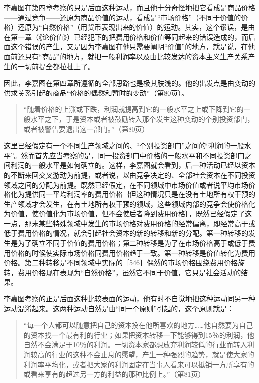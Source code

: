 李嘉图在第四章考察的只是后面这种运动，而且他十分奇怪地把它看成是商品价格——通过竞争——还原为商品价值的运动，看成是“市场价格”（不同于价值的价格）还原为“自然价格”（用货币表现出来的价值）的运动。其实，这个谬误，是由在第一章（《论价值》）已经犯下的把费用价格和价值等同起来的错误造成的，而后面这个错误的产生，又是因为李嘉图在他只需要阐明“价值”的地方，就是说，在他面前还只有“商品”的地方，就把一般利润率以及由比较发达的资本主义生产关系产生的一切前提全都拉扯上了。

因此，李嘉图在第四章所遵循的全部思路也是极其肤浅的。他的出发点是由变动的供求关系引起的商品“价格的偶然和暂时的变动”（第80页）。

\begin{quote}{“随着价格的上涨或下跌，利润就提高到它的一般水平之上或下降到它的一般水平之下，于是资本或者被鼓励转入那个发生这种变动的个别投资部门，或者被警告要退出这一部门。”（第80页）}\end{quote}

这里已经假定有一个不同生产领域之间的、“个别投资部门”之间的“利润的一般水平”。然而首先应当考察的是，同一投资部门中价格的一般水平和不同投资部门之间利润的一般水平是如何确立的。这样，李嘉图就会看到，后一种活动已经以资本的不断来回交叉游动为前提，或者说，以由竞争决定的、全部社会资本在不同投资领域之间的分配为前提。既然已经假定，在不同领域中市场价值或者说平均市场价格化为提供同一平均利润率的费用价格｛但这种情况只是在没有土地所有权干预的生产领域才会发生，在有土地所有权干预的领域，这些领域内部的竞争会使价格化为价值，使价值化为市场价值，但不会使后者降到费用价格｝，既然已经假定了这一点，那末某些特殊领域中发生的市场价格对费用价格的经常偏离，即经常高于或低于费用价格的情况，就会引起社会资本的新的转移和新的分配。第一种转移的发生是为了确立不同于价值的费用价格；第二种转移是为了在市场价格高于或低于费用价格的时候使实际市场价格同费用价格趋于一致。第一种转移是价值转化为费用价格。第二种转移是不同领域中实际的［546］偶然的市场价格围绕费用价格旋转，费用价格现在表现为“自然价格”，虽然它不同于价值，它只是社会活动的结果。

李嘉图考察的正是后面这种比较表面的运动，他有时不自觉地把这种运动同另一种运动混淆起来。这两种运动自然是由“同一个原则”引起的，这个原则就是：

\begin{quote}{“每一个人都可以随意把自己的资本投在他所喜欢的地方……他自然要为自己的资本找一个最有利的行业；如果把资本转移一下能够得到15％的利润，他自然不会满足于10％的利润。一切资本家都想放弃利润较低的行业而转入利润较高的行业的这种不会止息的愿望，产生一种强烈的趋势，就是使大家的利润率平均化，或者把大家的利润固定在当事人看来可以抵销一方所享有的或看来享有的超过另一方的利益的那种比例上。”（第81页）}\end{quote}

